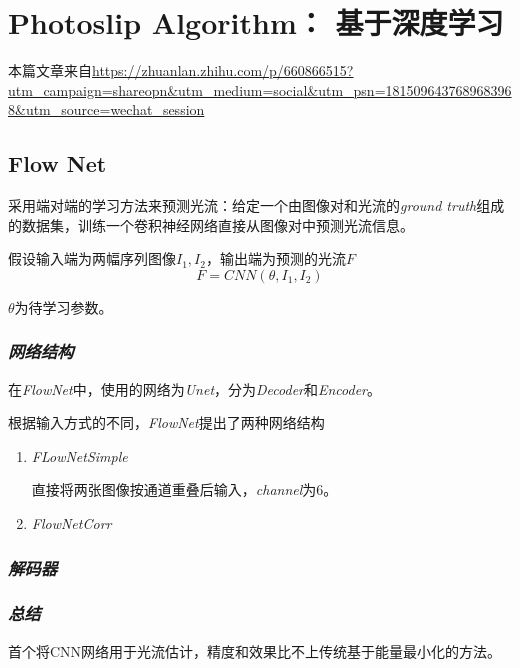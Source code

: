 \chapter{Photoslip Algorithm： 基于深度学习}

本篇文章来自\url{https://zhuanlan.zhihu.com/p/660866515?utm_campaign=shareopn&utm_medium=social&utm_psn=1815096437689683968&utm_source=wechat_session}

\section{Flow Net}

采用端对端的学习方法来预测光流：给定一个由图像对和光流的\textsl{ground truth}组成的数据集，训练一个卷积神经网络直接从图像对中预测光流信息。

假设输入端为两幅序列图像$I_1,I_2$，输出端为预测的光流$F$
\begin{equation}
    F=CNN(\theta, I_1, I_2)
\end{equation}

$\theta$为待学习参数。

\subsection*{\textsl{网络结构}}

在\textsl{FlowNet}中，使用的网络为\textsl{Unet}，分为\textsl{Decoder}和\textsl{Encoder}。

根据输入方式的不同，\textsl{FlowNet}提出了两种网络结构

\begin{enumerate}[itemindent=2em]
    \item \textsl{FLowNetSimple}
    
    直接将两张图像按通道重叠后输入，\textsl{channel}为$6$。

    \item \textsl{FlowNetCorr}
    
\end{enumerate}

\subsection*{\textsl{解码器}}

\subsection*{\textsl{总结}}

首个将CNN网络用于光流估计，精度和效果比不上传统基于能量最小化的方法。

